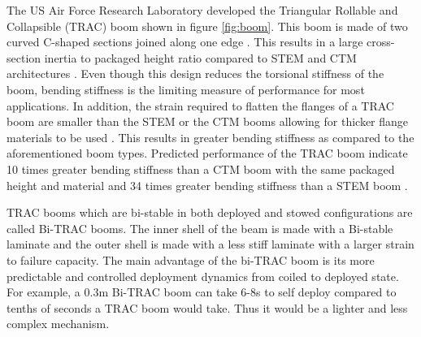 \par
The US Air Force Research Laboratory developed the Triangular Rollable and Collapsible (TRAC)  boom shown in figure \ref{fig:boom}. This boom is made of two curved C-shaped sections joined along one edge \cite{Murphey2011}. This results in a large cross-section inertia to packaged height ratio compared to STEM and CTM architectures \cite{Murphey2011}. Even though this design reduces the torsional stiffness of the boom, bending stiffness is the limiting measure of performance for most applications\cite{Murphey2011}. In addition, the strain required to flatten the flanges of a TRAC boom are smaller than the STEM or the CTM booms allowing for thicker flange materials to be used \cite{Murphey2011}. This results in greater bending stiffness as compared to the aforementioned boom types. Predicted performance of the TRAC boom indicate 10 times greater bending stiffness than a CTM boom with the same packaged height and material and 34 times greater bending stiffness than a STEM boom \cite{Murphey2011}.
\par
TRAC booms which are bi-stable in both deployed and stowed configurations are called Bi-TRAC booms. The inner shell of the beam is made with a Bi-stable laminate and the outer shell is made with a less stiff laminate with a larger strain to failure capacity. The main advantage of the bi-TRAC boom is its more predictable and controlled deployment dynamics from coiled to deployed state. For example, a 0.3m Bi-TRAC boom can take 6-8s to self deploy compared to tenths of seconds a TRAC boom would take. Thus it would be a lighter and less complex mechanism.

